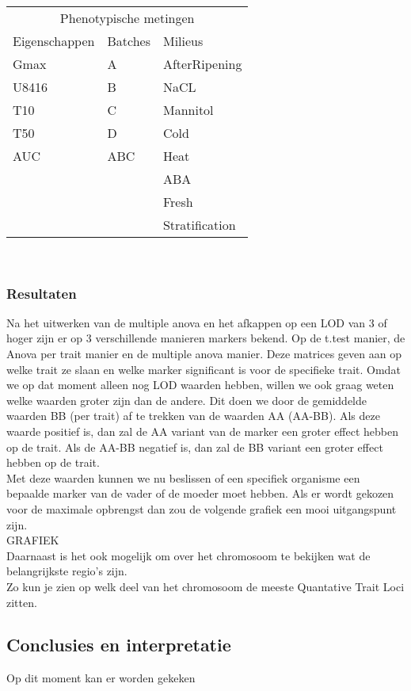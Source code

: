 \documentclass[12pt,a4paper, twocolumn]{article}
\begin{document}
\begin{tabular} {l  l  l}
\multicolumn{3}{c}{Phenotypische metingen} \\
Eigenschappen & Batches & Milieus\\ 
\hline 
Gmax & A & AfterRipening\\
U8416 & B & NaCL\\
T10 & C & Mannitol\\
T50 & D & Cold\\
AUC & ABC & Heat\\
 &  & ABA\\
 &  & Fresh\\
 &  & Stratification\\
\end{tabular}\\
\subsubsection*{Resultaten}
Na het uitwerken van de multiple anova en het afkappen op een LOD van 3 of hoger zijn er op 3 verschillende manieren markers bekend. 
Op de t.test manier, de Anova per trait manier en de multiple anova manier. 
Deze matrices geven aan op welke trait ze slaan en welke marker significant is voor de specifieke trait.
Omdat we op dat moment alleen nog LOD waarden hebben, willen we ook graag weten welke waarden groter zijn dan de andere. 
Dit doen we door de gemiddelde waarden BB (per trait) af te trekken van de waarden AA (AA-BB).
Als deze waarde positief is, dan zal de AA variant van de marker een groter effect hebben op de trait. 
Als de AA-BB negatief is, dan zal de BB variant een groter effect hebben op de trait. \\
Met deze waarden kunnen we nu beslissen of een specifiek organisme een bepaalde marker van de vader of de moeder moet hebben.
Als er wordt gekozen voor de maximale opbrengst dan zou de volgende grafiek een mooi uitgangspunt zijn.\\
GRAFIEK\\
Daarnaast is het ook mogelijk om over het chromosoom te bekijken wat de belangrijkste regio's zijn.\\
Zo kun je zien op welk deel van het chromosoom de meeste Quantative Trait Loci zitten.
\subsection*{Conclusies en interpretatie}
Op dit moment kan er worden gekeken 
\end{document}
